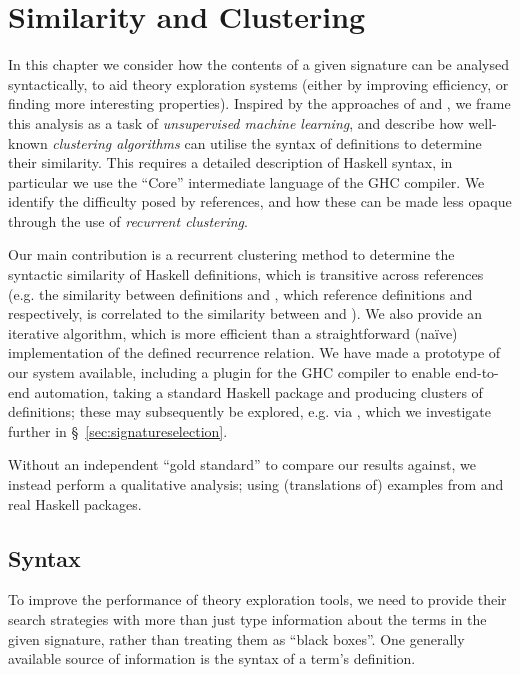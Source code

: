 \chapter{Similarity and Clustering}
\label{sec:recurrentclustering}

In this chapter we consider how the contents of a given signature can be
analysed syntactically, to aid theory exploration systems (either by improving
efficiency, or finding more interesting properties). Inspired by the approaches
of \aclml{} and \mlforpg{}, we frame this analysis as a task of
\emph{unsupervised machine learning}, and describe how well-known
\emph{clustering algorithms} can utilise the syntax of definitions to determine
their similarity. This requires a detailed description of Haskell syntax, in
particular we use the ``Core'' intermediate language of the GHC compiler. We
identify the difficulty posed by references, and how these can be made less
opaque through the use of \emph{recurrent clustering}.

Our main contribution is a recurrent clustering method to determine the
syntactic similarity of Haskell definitions, which is transitive across
references (e.g. the similarity between definitions  and , which
reference definitions  and  respectively, is correlated to the
similarity between  and ). We also provide an iterative
algorithm, which is more efficient than a straightforward (na\"ive)
implementation of the defined recurrence relation. We have made a prototype of
our system available, including a plugin for the \textsc{GHC} compiler to
enable end-to-end automation, taking a standard Haskell package and producing
clusters of definitions; these may subsequently be explored, e.g. via
\quickspec{}, which we investigate further in \S~\ref{sec:signatureselection}.

Without an independent ``gold standard'' to compare our results against, we
instead perform a qualitative analysis; using (translations of) examples from
\aclml{} and real Haskell packages.

\section{Syntax}

To improve the performance of theory exploration tools, we need to provide their
search strategies with more than just type information about the terms in the
given signature, rather than treating them as ``black boxes''. One generally
available source of information is the syntax of a term's definition.

